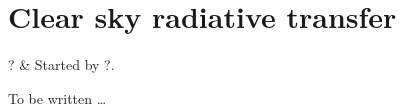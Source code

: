 \chapter{Clear sky radiative transfer}
 \label{sec:rte}


\starthistory
  ? & Started by ?. \\
\stophistory


To be written \dots



